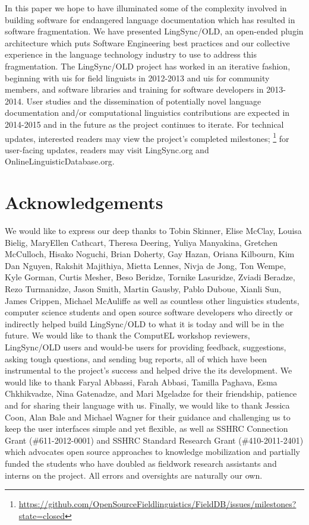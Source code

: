 \documentclass[11pt]{article}
\begin{document}
In this paper we hope to have illuminated some of the complexity involved in
building software for endangered language documentation which has resulted in software
fragmentation. We have presented LingSync/OLD,  an open-ended plugin
architecture which puts Software Engineering best practices and our collective
experience in the language technology industry  to use to address this
fragmentation. The LingSync/OLD project has worked in an iterative fashion,
beginning with \glspl{ui} for field linguists in 2012-2013 and \glspl{ui} for 
community members, and software libraries and training for software
developers in 2013-2014. User studies and the dissemination of potentially
novel language documentation and/or computational linguistics contributions are
expected in 2014-2015 and in the future as the project continues to iterate.
For technical updates, interested readers may view the project's completed
milestones;%
\footnote{\url{https://github.com/OpenSourceFieldlinguistics/FieldDB/issues/milestones?state=closed}} %
for user-facing updates, readers may visit LingSync.org and
OnlineLinguisticDatabase.org.


\section*{Acknowledgements}

We would like to express our deep thanks to Tobin Skinner, Elise McClay, Louisa
Bielig, MaryEllen Cathcart, Theresa Deering, Yuliya Manyakina, Gretchen
McCulloch, Hisako Noguchi, Brian Doherty, Gay Hazan, Oriana Kilbourn, Kim Dan
Nguyen, Rakshit Majithiya, Mietta Lennes, Nivja de Jong, Ton Wempe, Kyle
Gorman, Curtis Mesher, Beso Beridze, Tornike Lasuridze, Zviadi Beradze, Rezo
Turmanidze, Jason Smith, Martin Gausby, Pablo Duboue, Xianli Sun, James Crippen,
Michael McAuliffe as well as countless other linguistics students, computer
science students and open source software developers who directly or indirectly
helped build LingSync/OLD to what it is today and will be in the future. We
would like to thank the ComputEL workshop reviewers, LingSync/OLD users and
would-be users for providing feedback, suggestions, asking tough questions, and
sending bug reports, all of which have been instrumental to the project's
success and helped drive the its development. We would like to thank Faryal
Abbassi, Farah Abbasi, Tamilla Paghava, Esma Chkhikvadze, Nina Gatenadze, and
Mari Mgeladze for their friendship, patience and for sharing their language
with us.  Finally, we would like to thank Jessica Coon, Alan Bale and Michael
Wagner for their guidance and challenging us to keep the user interfaces simple
and yet flexible, as well as SSHRC Connection Grant (\#611-2012-0001) and SSHRC
Standard Research Grant (\#410-2011-2401) which advocates open source
approaches to knowledge mobilization and partially funded the students who have
doubled as fieldwork research assistants and interns on the project. All errors
and oversights are naturally our own.




\end{document}
